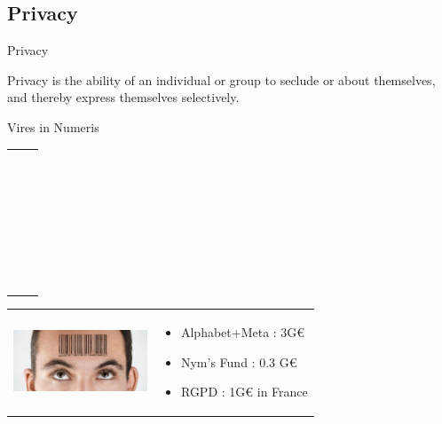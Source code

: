     \subsection{Privacy}
    \begin{frame}{Privacy}
    
    \begin{definition}[Wikipedia]
    Privacy is the ability of an individual or group to seclude {\color{blue2}{themselves}} or {\color{red}{information}} about themselves, and thereby express themselves {\color{red}selectively}.
    \end{definition}
 
    \begin{block}{Vires in Numeris}
    {
     \begin{tabular}{ll}
        \begin{minipage}{4cm}
         ~\\~\\~\\~\\
        \end{minipage}
        &
        \begin{minipage}{5.5cm}
         ~\\~\\~\\~\\
        \end{minipage}
      \end{tabular}  
    }
    {
    \begin{tabular}{ll}
        \begin{minipage}{4cm}
          \includegraphics[width=4cm]{images/privacy.jpeg}
        \end{minipage}
        &
        \begin{minipage}{5.5cm}
         \begin{itemize}
          \item Alphabet+Meta : 3G€
          \item Nym's Fund : 0.3 G€
          \item RGPD : 1G€ in France
         \end{itemize}

        \end{minipage}
    \end{tabular}  
    }
    \end{block}
    

\end{frame}
